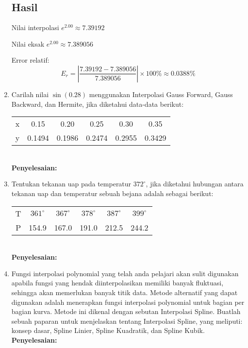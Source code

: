 \documentclass{article}
\newcommand{\penyelesaian}{\textbf{Penyelesaian: }}
\begin{document}
\begin{enumerate}
    \subsection*{Hasil}
    Nilai interpolasi \( e^{2.00} \approx 7.39192 \)

    Nilai eksak \( e^{2.00} \approx 7.389056 \)

    Error relatif:
    \[
    \text{\(E_r\)} = \left| \frac{7.39192 - 7.389056}{7.389056} \right| \times 100\% \approx 0.0388\%
    \]

    \item Carilah nilai $\sin(\num{0,28})$ menggunakan Interpolasi Gauss Forward, Gauss Backward, dan Hermite, jika diketahui data-data berikut: \\
    \begin{tabular}{ c c c c c c }
        x & \num{0,15} & \num{0,20} & \num{0,25} & \num{0,30} & \num{0,35} \\
        y & \num{0,1494} & \num{0,1986} & \num{0,2474} & \num{0,2955} & \num{0,3429} \\
    \end{tabular} \\
    \penyelesaian

    \item Tentukan tekanan uap pada temperatur $372^{\circ}$, jika diketahui hubungan antara tekanan uap dan temperatur sebuah bejana adalah sebagai berikut: \\
        \begin{tabular}{ c c c c c c }
        T & $361^{\circ}$ & $367^{\circ}$ & $378^{\circ}$ & $387^{\circ}$ & $399^{\circ}$ \\
        P & \num{154,9} & \num{167,0} & \num{191,0} & \num{212,5} & \num{244,2} \\
    \end{tabular} \\
    \penyelesaian

    \item Fungsi interpolasi polynomial yang telah anda pelajari akan sulit digunakan apabila fungsi yang hendak diinterpolasikan memiliki banyak fluktuasi, sehingga akan memerlukan banyak titik data.
    Metode alternatif yang dapat digunakan adalah menerapkan fungsi interpolasi polynomial untuk bagian per bagian kurva. 
    Metode ini dikenal dengan sebutan Interpolasi Spline. Buatlah sebuah paparan untuk menjelaskan tentang Interpolasi Spline, yang meliputi: konsep dasar, Spline Linier, Spline Kuadratik, dan Spline Kubik. \\
    \penyelesaian

\end{enumerate}
\end{document}
